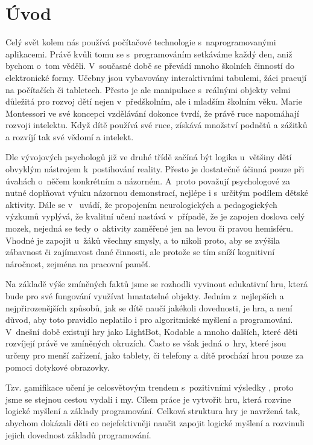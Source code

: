 \chapter{Úvod}

Celý svět kolem nás používá počítačové technologie s~naprogramovanými aplikacemi. Právě kvůli tomu se s~programováním setkáváme každý den, aniž bychom o~tom věděli. V~současné době se převádí mnoho školních činností do elektronické formy. Učebny jsou vybavovány interaktivními tabulemi, žáci pracují na počítačích či tabletech. Přesto je ale manipulace s~reálnými objekty velmi důležitá pro rozvoj dětí nejen v~předškolním, ale i mladším školním věku. Marie Montessori ve své koncepci vzdělávání dokonce tvrdí, že právě ruce napomáhají rozvoji intelektu. Když dítě používá své ruce, získává množství podnětů a zážitků a rozvíjí tak své vědomí a intelekt. \cite{Montessori}
\par
Dle vývojových psychologů \cite{VyvojovaPsychologie} již ve druhé třídě začíná být logika u~většiny dětí obvyklým nástrojem k~postihování reality. Přesto je dostatečně účinná pouze při úvahách o~něčem konkrétním a názorném. A~proto považují psychologové za nutné doplňovat výuku názornou demonstrací, nejlépe i s~určitým podílem dětské aktivity. Dále se v~\cite{ASE} uvádí, že propojením neurologických a pedagogických výzkumů vyplývá, že kvalitní učení nastává v~případě, že je zapojen doslova celý mozek, nejedná se tedy o~aktivity zaměřené jen na levou či pravou hemisféru. Vhodné je zapojit u~žáků všechny smysly, a to nikoli proto, aby se zvýšila zábavnost či zajímavost dané činnosti, ale protože se tím sníží kognitivní náročnost, zejména na pracovní paměť.
\par
Na základě výše zmíněných faktů jsme se rozhodli vyvinout edukativní hru, která bude pro své fungování využívat hmatatelné objekty. Jedním z~nejlepších a nejpřirozenějších způsobů, jak se dítě naučí jakékoli dovednosti, je hra, a není důvod, aby toto pravidlo neplatilo i pro algoritmické myšlení a programování. V~dnešní době existují hry jako LightBot, Kodable a mnoho dalších, které děti rozvíjejí právě ve zmíněných okruzích. Často se však jedná o~hry, které jsou určeny pro menší zařízení, jako tablety, či telefony a dítě prochází hrou pouze za pomoci dotykové obrazovky.
\par
Tzv. gamifikace učení je celosvětovým trendem s~pozitivními výsledky \cite{Gamification}, proto jsme se stejnou cestou vydali i my. Cílem práce je vytvořit hru, která rozvine logické myšlení a základy programování. Celková struktura hry je navržená tak, abychom dokázali děti co nejefektivněji naučit zapojit logické myšlení a rozvinuli jejich dovednost základů programování.